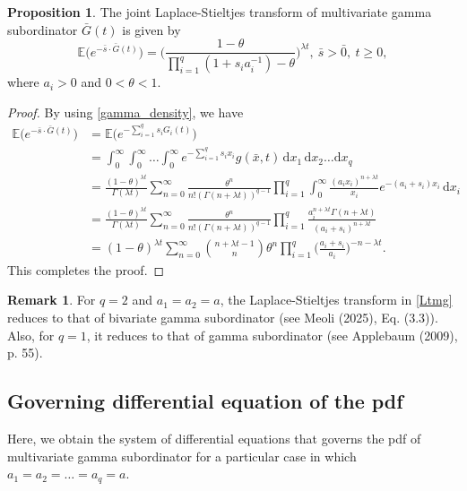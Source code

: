\documentclass[12pt,oneside,reqno]{amsart}
\numberwithin{equation}{section}
\theoremstyle{definition}
\numberwithin{equation}{section}
\newtheorem{remark}{\bf Remark}[section]
\newtheorem{proposition}{Proposition}[section]
\theoremstyle{remarkstyle}
\begin{document}
%
%
%
%
%
\begin{proposition}
The joint Laplace-Stieltjes transform of multivariate gamma subordinator $\bar{G}(t)$ is given by
\begin{equation}\label{Ltmg}
\mathbb{E}\big(e^{-\bar{s}\cdot\bar{G}(t)}\big)=\Big(\frac{1-\theta}{\prod_{i=1}^{q}(1+s_ia_i^{-1})-\theta}\Big)^{\lambda t},\ \bar{s}>\bar{0},\ t\ge0,
\end{equation}
where $a_i>0$ and $0<\theta<1$.
\end{proposition}
\begin{proof}
	By using \eqref{gamma_density}, we have
	\begin{align*}
		\mathbb{E}\big(e^{-\bar{s}\cdot\bar{G}(t)}\big)&=\mathbb{E}\big(e^{-\sum_{i=1}^{q}s_i G_i(t)}\big)\\
		&=\int_{0}^{\infty}\int_{0}^{\infty}\dots\int_{0}^{\infty}e^{-\sum_{i=1}^{q}s_i x_i}g(\bar{x},t)\,\mathrm{d}x_1\,\mathrm{d}x_2\dots\mathrm{d}x_q\\
		&=\frac{(1-\theta)^{\lambda t}}{\Gamma(\lambda t)}\sum_{n=0}^{\infty}\frac{\theta ^n}{n!(\Gamma(n+\lambda t))^{q-1}}\prod_{i=1}^{q}\int_{0}^{\infty}\frac{(a_ix_i)^{n+\lambda t}}{x_i}e^{-(a_i+s_i)x_i}\,\mathrm{d}x_i\\
		&=\frac{(1-\theta)^{\lambda t}}{\Gamma(\lambda t)}\sum_{n=0}^{\infty}\frac{\theta ^n}{n!(\Gamma(n+\lambda t))^{q-1}}\prod_{i=1}^{q}\frac{a_i^{n+\lambda t}\Gamma(n+\lambda t)}{(a_i+s_i)^{n+\lambda t}}\\
		&=(1-\theta)^{\lambda t}\sum_{n=0}^{\infty}{n+\lambda t-1 \choose n}\theta ^n\prod_{i=1}^{q}\Big(\frac{a_i+s_i}{a_i}\Big)^{-n-\lambda t}.
	\end{align*}
	This completes the proof.
\end{proof}
\begin{remark}
For $q=2$ and $a_1=a_2=a$, the Laplace-Stieltjes transform in \eqref{Ltmg} reduces to that of bivariate gamma subordinator (see Meoli (2025), Eq. (3.3)). Also, for $q=1$, it reduces to that of gamma subordinator (see Applebaum (2009), p. 55).
\end{remark}
\subsection{Governing differential equation of the pdf} Here, we obtain the system of differential equations that governs the pdf of multivariate gamma subordinator for a particular case in which $a_1=a_2=\dots=a_q=a$. 
	
\end{document}
